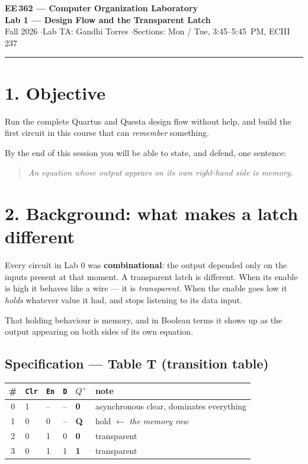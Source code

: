 \documentclass[11pt]{article}
\newcommand{\code}[1]{\texttt{#1}}
\newcommand{\hr}{\vspace{2pt}\hrule\vspace{6pt}}
\begin{document}
\begin{center}
{\Large\bfseries EE\,362 --- Computer Organization Laboratory}\\[2pt]
{\large\bfseries Lab 1 --- Design Flow and the Transparent Latch}\\[4pt]
Fall 2026 \quad$\cdot$\quad Lab TA: Gandhi Torres \quad$\cdot$\quad Sections: Mon / Tue, 3:45--5:45~PM, ECIII 237
\end{center}
\hr

\section*{1. Objective}

Run the complete Quartus and Questa design flow without help, and build the first
circuit in this course that can \emph{remember} something.

By the end of this session you will be able to state, and defend, one sentence:

\begin{quote}
\emph{An equation whose output appears on its own right-hand side is memory.}
\end{quote}

\section*{2. Background: what makes a latch different}

Every circuit in Lab 0 was \textbf{combinational}: the output depended only on the
inputs present at that moment. A transparent latch is different. When its enable
is high it behaves like a wire --- it is \emph{transparent}. When the enable goes
low it \emph{holds} whatever value it had, and stops listening to its data input.

That holding behaviour is memory, and in Boolean terms it shows up as the output
appearing on both sides of its own equation.

\subsection*{Specification --- Table T (transition table)}

\begin{center}
\begin{tabular}{clll@{\hskip 8pt}||@{\hskip 8pt}ll}
\toprule
\# & \code{Clr} & \code{En} & \code{D} & $Q^{+}$ & note \\
\midrule
0 & 1 & -- & -- & \textbf{0} & asynchronous clear, dominates everything \\
1 & 0 & 0 & -- & \textbf{Q} & hold \quad$\leftarrow$\; \emph{the memory row} \\
2 & 0 & 1 & 0 & \textbf{0} & transparent \\
3 & 0 & 1 & 1 & \textbf{1} & transparent \\
\bottomrule
\end{tabular}
\end{center}
\end{document}
